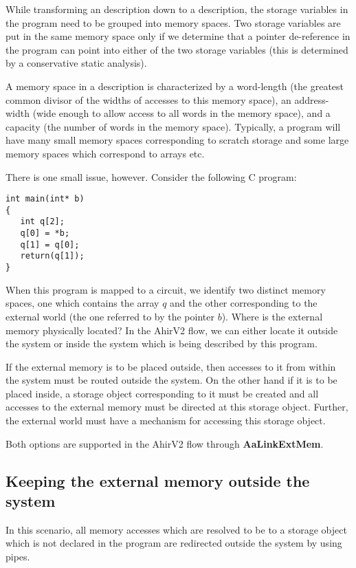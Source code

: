 While transforming an \Aa description down to a \vC description,
the storage variables in the \Aa program need to be grouped
into memory spaces.  Two storage variables are put in the 
same memory space only if we
determine that a pointer de-reference in the \Aa
program can point into either of the two storage variables
(this is determined by a conservative static analysis).

A memory space in a \vC description is characterized by
a word-length (the greatest common divisor of the widths
of accesses to this memory space), an address-width (wide enough
to allow access to all words in the memory space), and
a capacity (the number of words in the memory space).  Typically,
a program will have many small memory spaces corresponding to
scratch storage and some large memory spaces which correspond
to arrays etc.


There is one small issue, however.
Consider the following C program:
\begin{verbatim}
int main(int* b)
{
   int q[2];
   q[0] = *b;
   q[1] = q[0];
   return(q[1]);
}
\end{verbatim}
When this program is mapped to a circuit, we identify 
two distinct memory spaces, one which contains the
array $q$ and the other corresponding to the 
external world (the one referred to by the pointer $b$).
Where is the external memory physically located?  In 
the AhirV2 flow, we can either locate it outside
the system or inside the system which is being 
described by this program.

If the external memory is to be placed outside, then
accesses to it from within the system must be routed
outside the system.  On the other hand if it is
to be placed inside, a storage object corresponding 
to it must be created and all accesses to the external
memory must be directed at this storage object.
Further, the external world must have a mechanism for
accessing this storage object.

Both options are supported in the AhirV2 flow through
{\bf AaLinkExtMem}.


\subsection{Keeping the external memory outside the system}

In this scenario, all memory accesses which are resolved
to be to a storage object which is not declared in the
\Aa program are redirected outside the system by using
pipes.

